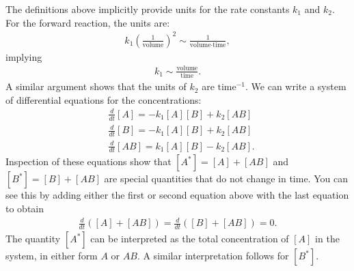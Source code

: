\documentclass[10pt]{article}
\begin{document}
The definitions above implicitly provide units for the rate constants $k_1$ and $k_2$.  For the forward reaction, the units are:
\begin{align*}
k_1 \left(\frac{1}{\text{volume}} \right)^2 \sim \frac{1}{\text{volume} \cdot \text{time}},
\end{align*}
implying
\begin{align*}
k_1 \sim \frac{\text{volume}}{\text{time}}.
\end{align*}
A similar argument shows that the units of $k_2$ are $\text{time}^{-1}$.  We can write a system of differential equations for the concentrations:
\begin{align*}
&\frac{d}{dt}[A] = -k_1 [A][B] + k_2 [AB] \\
&\frac{d}{dt}[B] = -k_1 [A][B] + k_2 [AB] \\
&\frac{d}{dt}[AB] = k_1 [A][B] - k_2 [AB]. 
\end{align*}
Inspection of these equations show that $[A^*] = [A] + [AB]$ and $[B^*] = [B] + [AB]$ are special quantities that do not change in time.  You can see this by adding either the first or second equation above with the last equation to obtain
\begin{align*}
\frac{d}{dt}\left( [A] + [AB] \right) = \frac{d}{dt}\left( [B] + [AB] \right) = 0. 
\end{align*}
The quantity $[A^*]$ can be interpreted as the total concentration of $[A]$ in the system, in either form $A$ or $AB$.  A similar interpretation follows for $[B^*]$.
\end{document}
